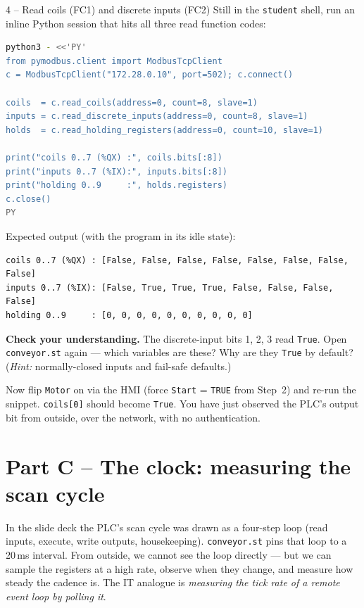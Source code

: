 \documentclass[11pt,a4paper]{article}
\begin{document}
\begin{stepbox}{4 -- Read coils (FC1) and discrete inputs (FC2)}
Still in the \texttt{student} shell, run an inline Python session that hits all three read function codes:
\begin{lstlisting}[language=bash]
python3 - <<'PY'
from pymodbus.client import ModbusTcpClient
c = ModbusTcpClient("172.28.0.10", port=502); c.connect()

coils  = c.read_coils(address=0, count=8, slave=1)
inputs = c.read_discrete_inputs(address=0, count=8, slave=1)
holds  = c.read_holding_registers(address=0, count=10, slave=1)

print("coils 0..7 (%QX) :", coils.bits[:8])
print("inputs 0..7 (%IX):", inputs.bits[:8])
print("holding 0..9     :", holds.registers)
c.close()
PY
\end{lstlisting}
Expected output (with the program in its idle state):
\begin{lstlisting}
coils 0..7 (%QX) : [False, False, False, False, False, False, False, False]
inputs 0..7 (%IX): [False, True, True, True, False, False, False, False]
holding 0..9     : [0, 0, 0, 0, 0, 0, 0, 0, 0, 0]
\end{lstlisting}

\noindent\textbf{Check your understanding.} The discrete-input bits 1, 2, 3 read \texttt{True}. Open \texttt{conveyor.st} again --- which variables are these? Why are they \texttt{True} by default? (\emph{Hint:} normally-closed inputs and fail-safe defaults.)

\smallskip
Now flip \texttt{Motor} on via the HMI (force \texttt{Start} = \texttt{TRUE} from Step~2) and re-run the snippet. \texttt{coils[0]} should become \texttt{True}. You have just observed the PLC's output bit from outside, over the network, with no authentication.
\end{stepbox}

\section*{Part C -- The clock: measuring the scan cycle}

In the slide deck the PLC's scan cycle was drawn as a four-step loop (read inputs, execute, write outputs, housekeeping). \texttt{conveyor.st} pins that loop to a 20\,ms interval. From outside, we cannot see the loop directly --- but we can sample the registers at a high rate, observe when they change, and measure how steady the cadence is. The IT analogue is \emph{measuring the tick rate of a remote event loop by polling it}.
\end{document}
